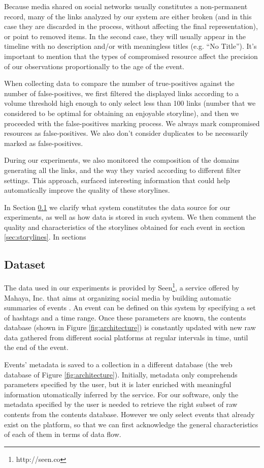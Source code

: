 \documentclass{sig-alternate}
\begin{document}
Because media shared on social networks usually constitutes a non-permanent record, many of the links analyzed by our system are either broken (and in this case they are discarded in the process, without affecting the final representation), or point to removed items. In the second case, they will usually appear in the timeline with no description and/or with meaningless titles (e.g. ``No Title''). It's important to mention that the types of compromised resource affect the precision of our observations proportionally to the age of the event.

When collecting data to compare the number of true-positives against the number of false-positives, we first filtered the displayed links according to a volume threshold high enough to only select less than 100 links (number that we considered to be optimal for obtaining an enjoyable storyline), and then we proceeded with the false-positives marking process. We always mark compromised resources as false-positives. We also don't consider duplicates to be necessarily marked as false-positives.

During our experiments, we also monitored the composition of the domains generating all the links, and the way they varied according to different filter settings. This approach, surfaced interesting information that could help automatically improve the quality of these storylines.

In Section \ref{sec:dataset} we clarify what system constitutes the data source for our experiments, as well as how data is stored in such system. We then comment the quality and characteristics of the storylines obtained for each event in section \ref{sec:storylines}. In sections

\subsection{Dataset}
\label{sec:dataset}
The data used in our experiments is provided by Seen\footnote{http://seen.co}, a service offered by Mahaya, Inc. that aims at organizing social media by building automatic summaries of events \cite{SeenWired}. An event can be defined on this system by specifying a set of hashtags and a time range. Once these parameters are known, the contents database (shown in Figure \ref{fig:architecture}) is constantly updated with new raw data gathered from different social platforms at regular intervals in time, until the end of the event.

Events' metadata is saved to a collection in a different database (the web database of Figure \ref{fig:architecture}). Initially, metadata only comprehends parameters specified by the user, but it is later enriched with meaningful information utomatically inferred by the service. For our software, only the metadata specified by the user is needed to retrieve the right subset of raw contents from the contents database. However we only select events that already exist on the platform, so that we can first acknowledge the general characteristics of each of them in terms of data flow.
\end{document}
